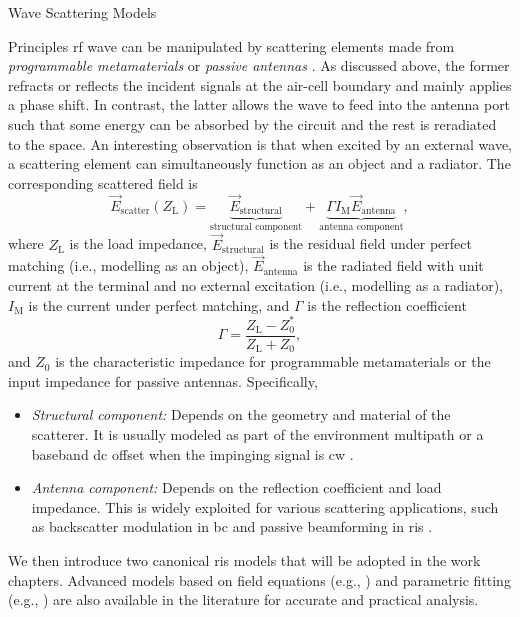 \begin{section}{}
	\begin{subsection}{Wave Scattering Models}
		\begin{subsubsection}{Principles}\label{sc:principles}
			\gls{rf} wave can be manipulated by scattering elements made from \emph{programmable metamaterials} or \emph{passive antennas} \cite{Liang2022}.
			As discussed above, the former refracts or reflects the incident signals at the air-cell boundary and mainly applies a phase shift.
			In contrast, the latter allows the wave to feed into the antenna port such that some energy can be absorbed by the circuit and the rest is reradiated to the space.
			An interesting observation is that when excited by an external wave, a scattering element can simultaneously function as an object and a radiator.
			The corresponding scattered field is \cite{Hansen1989}
			\begin{equation}
				\vec{E}_\text{scatter}(Z_\mathrm{L}) = \underbrace{\vec{E}_\text{structural}}_\text{structural component} + \underbrace{\Gamma I_\mathrm{M} \vec{E}_\text{antenna}}_\text{antenna component},
			\end{equation}
			where $Z_\mathrm{L}$ is the load impedance, $\vec{E}_\text{structural}$ is the residual field under perfect matching (i.e., modelling as an object), $\vec{E}_\text{antenna}$ is the radiated field with unit current at the terminal and no external excitation (i.e., modelling as a radiator), $I_\mathrm{M}$ is the current under perfect matching, and $\Gamma$ is the reflection coefficient
			\begin{equation}
				\Gamma = \frac{Z_\mathrm{L} - Z_0^*}{Z_\mathrm{L} + Z_0},
				\label{eq:reflection_coefficient}
			\end{equation}
			and $Z_0$ is the characteristic impedance for programmable metamaterials or the input impedance for passive antennas.
			Specifically,
			\begin{itemize}
				\item \emph{Structural component:} Depends on the geometry and material of the scatterer. It is usually modeled as part of the environment multipath \cite{Thomas2012,Liang2020} or a baseband \gls{dc} offset when the impinging signal is \gls{cw} \cite{Boyer2014}.
				\item \emph{Antenna component:} Depends on the reflection coefficient and load impedance. This is widely exploited for various scattering applications, such as backscatter modulation in \gls{bc} and passive beamforming in \gls{ris} \cite{Zhao2024}.
			\end{itemize}
			We then introduce two canonical \gls{ris} models that will be adopted in the work chapters.
			Advanced models based on field equations (e.g., \cite{Ozdogan2020,Najafi2020}) and parametric fitting (e.g., \cite{Abeywickrama2020}) are also available in the literature for accurate and practical analysis.
		\end{subsubsection}


\end{subsection}
\end{section}
